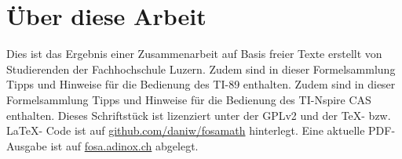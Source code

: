 \chapter*{Über diese Arbeit}
Dies ist das Ergebnis einer Zusammenarbeit auf Basis freier Texte erstellt von Studierenden der Fachhochschule Luzern. 
\ifti
Zudem sind in dieser Formelsammlung Tipps und Hinweise für die Bedienung des TI-89 enthalten. 
\fi
\ifnspire
Zudem sind in dieser Formelsammlung Tipps und Hinweise für die Bedienung des TI-Nspire CAS enthalten. 
\fi
Dieses Schriftstück ist lizenziert unter der GPLv2 und der \TeX-  bzw. \LaTeX- Code ist auf \url{github.com/daniw/fosamath} hinterlegt.
Eine aktuelle PDF-Ausgabe ist auf \url{fosa.adinox.ch} abgelegt. 

